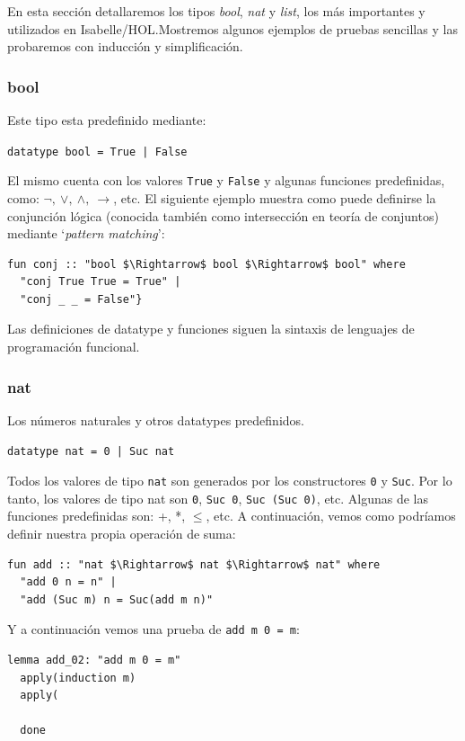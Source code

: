 \documentclass[12pt]{book}
\begin{document}
En esta sección detallaremos los tipos \textit{bool}, \textit{nat} y \textit{list}, los más importantes y utilizados en Isabelle/HOL.\@ Mostremos algunos ejemplos de pruebas sencillas y las probaremos con inducción y simplificación.

\subsubsection{bool}

Este tipo esta predefinido mediante:

\texttt{datatype bool = True | False}

El mismo cuenta con los valores \texttt{True} y \texttt{False} y algunas funciones predefinidas,\\ como:  $\neg,\ \vee,\ \wedge,\ \rightarrow$, etc. El siguiente ejemplo muestra como puede definirse la conjunción lógica (conocida también como intersección en teoría de conjuntos) mediante `\textit{pattern matching}':

\begin{lstlisting}[upquote=true, mathescape=true, basicstyle=\ttfamily]
  fun conj :: "bool $\Rightarrow$ bool $\Rightarrow$ bool" where
  "conj True True = True" |
  "conj _ _ = False"}
\end{lstlisting}

Las definiciones de datatype y funciones siguen la sintaxis de lenguajes de programación funcional.

\subsubsection{nat}
Los números naturales y otros datatypes predefinidos.

\texttt{datatype nat = 0 | Suc nat}

Todos los valores de tipo \texttt{nat} son generados por los constructores \texttt{0} y \texttt{Suc}. Por lo tanto, los valores de tipo nat son \texttt{0}, \texttt{Suc 0}, \texttt{Suc (Suc 0)}, etc. Algunas de las funciones predefinidas son: +, *, $\leq$, etc. A continuación, vemos como podríamos definir nuestra propia operación de suma:

\begin{lstlisting}[upquote=true, mathescape=true, basicstyle=\ttfamily]
  fun add :: "nat $\Rightarrow$ nat $\Rightarrow$ nat" where
  "add 0 n = n" |
  "add (Suc m) n = Suc(add m n)"
\end{lstlisting}

Y a continuación vemos una prueba de \texttt{add m 0 = m}:
\begin{lstlisting}[upquote=true, mathescape=true, basicstyle=\ttfamily]
  lemma add_02: "add m 0 = m"
  apply(induction m)
  apply(
	  
  done
\end{lstlisting}
\end{document}
